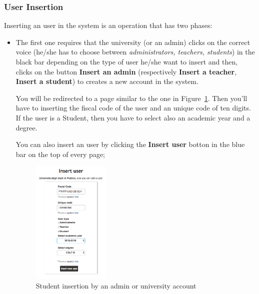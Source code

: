 \subsubsection{User Insertion}
Inserting an user in the system is an operation that has two phases: 
\begin{itemize}
	\item The first one requires that the university (or an admin) clicks on the correct voice (he/she has to choose between \emph{administrators, teachers, students}) in the black bar depending on the type of user he/she want to insert and then, clicks on the button \textbf{Insert an admin} (respectively \textbf{Insert a teacher}, \textbf{Insert a student}) to creates a new account in the system.
	
	You will be redirected to a page similar to the one in Figure~\ref{fig:userInsertionStudent}. Then you'll have to inserting the fiscal code of the user and an unique code of ten digits. If the user is a Student, then you have to select also an academic year and a degree.
	
	You can also insert an user by clicking the \textbf{Insert user} botton in the blue bar on the top of every page;
	\begin{figure}[H]
		\centering
		\includegraphics[width=0.35\textwidth]{img/userInsertionStudent.png}
		\caption{Student insertion by an admin or university account}
		\label{fig:userInsertionStudent}
	\end{figure}
	

\end{itemize}
